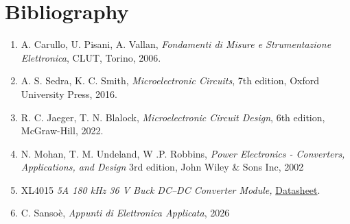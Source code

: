 \documentclass[../main.tex]{subfiles}
\begin{document}
\clearpage
\thispagestyle{empty}

\vspace*{7cm}
\section*{Bibliography}
\vspace*{1.5cm}

\begin{enumerate}

\item A. Carullo, U. Pisani, A. Vallan,
\textit{Fondamenti di Misure e Strumentazione Elettronica}, 
CLUT, Torino, 2006.

\item A. S. Sedra, K. C. Smith,
\textit{Microelectronic Circuits}, 7th edition,
Oxford University Press, 2016.

\item R. C. Jaeger, T. N. Blalock,
\textit{Microelectronic Circuit Design}, 6th edition,
McGraw-Hill, 2022.

\item N. Mohan, T. M. Undeland, W .P. Robbins, 
\textit{Power Electronics - Converters, Applications, and Design} 3rd edition, John Wiley \& Sons Inc, 2002

\item XL4015 
\textit{5A 180 kHz 36 V Buck DC–DC Converter Module,} \href{https://www.elecrow.com/download/XL4015_datasheet.pdf?srsltid=AfmBOop6tooACo3ApT_X-BGUvHYK9SOMC-rYtkAcLZKgQLVAaR5dOio5}{Datasheet}. 

\item C. Sansoè, 
\textit{Appunti di Elettronica Applicata}, 2026




\end{enumerate}
\end{document}
